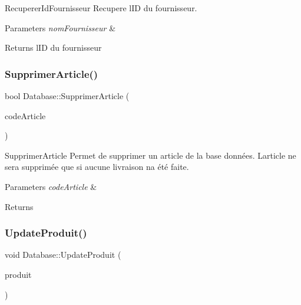 Recuperer\+Id\+Fournisseur Recupere l\textquotesingle{}ID du fournisseur. 


\begin{DoxyParams}{Parameters}
{\em nom\+Fournisseur} & \\
\hline
\end{DoxyParams}
\begin{DoxyReturn}{Returns}
l\textquotesingle{}ID du fournisseur 
\end{DoxyReturn}
\mbox{\label{class_database_ac8d2f6181cefec25fe56d1fdbdeca59f}} 
\subsubsection{\texorpdfstring{Supprimer\+Article()}{SupprimerArticle()}}
{\footnotesize\ttfamily bool Database\+::\+Supprimer\+Article (\begin{DoxyParamCaption}\item[{Q\+String}]{code\+Article }\end{DoxyParamCaption})}



Supprimer\+Article Permet de supprimer un article de la base données. L\textquotesingle{}article ne sera supprimée que si aucune livraison n\textquotesingle{}a été faite. 


\begin{DoxyParams}{Parameters}
{\em code\+Article} & \\
\hline
\end{DoxyParams}
\begin{DoxyReturn}{Returns}

\end{DoxyReturn}
\mbox{\label{class_database_a145776bb933815c6b895d90ef8e0c64d}} 
\subsubsection{\texorpdfstring{Update\+Produit()}{UpdateProduit()}}
{\footnotesize\ttfamily void Database\+::\+Update\+Produit (\begin{DoxyParamCaption}\item[{\mbox{\hyperlink{class_article}{Article}} \&}]{produit }\end{DoxyParamCaption})}



